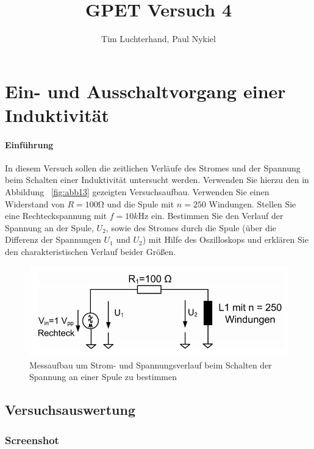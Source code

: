 \documentclass[10pt]{report}
\author{Tim Luchterhand, Paul Nykiel}
\title{GPET Versuch 4}
\begin{document}
        \maketitle
        \section{Ein- und Ausschaltvorgang einer Induktivität}
        \paragraph{Einführung}
        In diesem Versuch sollen die zeitlichen Verläufe des Stromes und der Spannung beim
        Schalten einer Induktivität untersucht werden. Verwenden Sie hierzu den in Abbildung
        ~\ref{fig:abb13} gezeigten Versuchsaufbau. Verwenden Sie einen Widerstand von $R=100\si{\ohm}$ und die
        Spule mit $n=250$ Windungen. Stellen Sie eine Rechteckspannung mit $f=10\si{k\hertz}$ ein.
        Bestimmen Sie den Verlauf der Spannung an der Spule, $U_2$, sowie des Stromes durch die
        Spule (über die Differenz der Spannungen $U_1$ und $U_2$) mit Hilfe des Oszilloskops und
        erklären Sie den charakteristischen Verlauf beider Größen.
        \begin{center}
            \begin{figure}[H]
                \includegraphics[width=\textwidth]{Abbildung13.png}
                \caption{Messaufbau um Strom- und Spannungsverlauf beim Schalten der Spannung
an einer Spule zu bestimmen}
                \label{fig  :abb13}
            \end{figure}
        \end{center}

        \subsection{Versuchsauswertung}

        \subsubsection{Screenshot}
\end{document}

